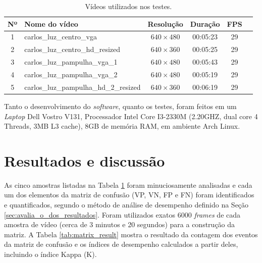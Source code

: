 \begin{table}[ht]
  \caption{Vídeos utilizados nos testes.}
  \label{tab:videos_teste}
  \begin{center}
    \begin{tabular}{clcccc}
    \toprule
    \textbf{Nº} & \textbf{Nome do vídeo} & \textbf{Resolução} & \textbf{Duração} & \textbf{FPS} \\
    \midrule
      1 & carlos\_luz\_centro\_vga & $ 640\times 480 $ & 00:05:23 & 29 \\
      2 & carlos\_luz\_centro\_hd\_resized & $ 640\times 360 $ & 00:05:25 & 29 \\
      3 & carlos\_luz\_pampulha\_vga\_1 & $ 640\times 480 $ & 00:05:43 & 29 \\
      4 & carlos\_luz\_pampulha\_vga\_2 & $ 640\times 480 $ & 00:05:19 & 29 \\
      5 & carlos\_luz\_pampulha\_hd\_2\_resized & $ 640\times 360 $ & 00:06:19 & 29 \\
    \bottomrule
    \end{tabular}
  \end{center}
\end{table}

Tanto o desenvolvimento do \textit{software}, quanto os testes, foram feitos em um \textit{Laptop} Dell Vostro V131, Processador Intel Core I3-2330M (2.20GHZ, dual core 4 Threads, 3MB L3 cache), 8GB de memória RAM, em ambiente Arch Linux.


\section{Resultados e discussão} %
\label{sec:resultados_e_discuss_o}

As cinco amostras listadas na Tabela \ref{tab:videos_teste} foram minuciosamente analisadas e cada um dos elementos da matriz de confusão (VP, VN, FP e FN) foram identificados e quantificados, segundo o método de análise de desempenho definido na Seção \ref{sec:avalia_o_dos_resultados}. Foram utilizados exatos $6000$ \textit{frames} de cada amostra de vídeo (cerca de 3 minutos e 20 segundos) para a construção da matriz. A Tabela \ref{tab:matrix_result} mostra o resultado da contagem dos eventos da matriz de confusão e os índices de desempenho calculados a partir deles, incluindo o índice Kappa (K).

